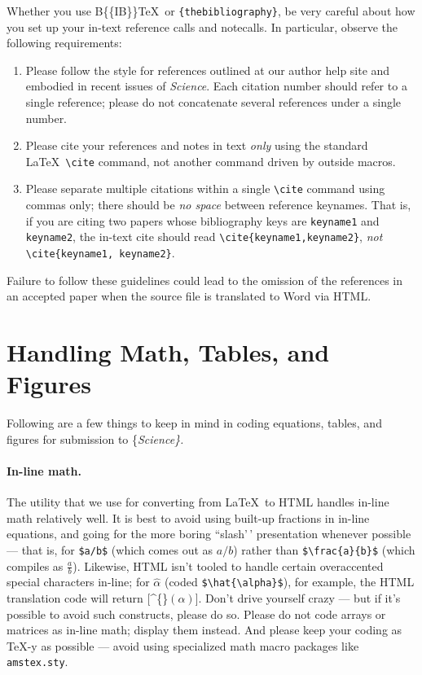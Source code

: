 \documentclass[12pt]{article}
\begin{document}
Whether you use B\{\small\{IB\}\}\TeX~or \texttt{\{thebibliography\}},
be very careful about how you set up your in-text reference calls and
notecalls. In particular, observe the following requirements:

\begin{enumerate}
\item Please follow the style for references outlined at our author
  help site and embodied in recent issues of {\it Science}.  Each
  citation number should refer to a single reference; please do not
  concatenate several references under a single number.
\item Please cite your references and notes in text {\it only\/} using
  the standard \LaTeX\ \verb+\cite+ command, not another command
  driven by outside macros.
\item Please separate multiple citations within a single \verb+\cite+
  command using commas only; there should be {\it no space\/}
  between reference keynames.  That is, if you are citing two
  papers whose bibliography keys are \texttt{keyname1} and
  \texttt{keyname2}, the in-text cite should read
  \verb+\cite{keyname1,keyname2}+, {\it not\/}
  \verb+\cite{keyname1, keyname2}+.
\end{enumerate}

\noindent Failure to follow these guidelines could lead to the omission
of the references in an accepted paper when the source file is
translated to Word via HTML.

\hypertarget{handling-math-tables-and-figures}{%
\section{Handling Math, Tables, and
Figures}\label{handling-math-tables-and-figures}}

Following are a few things to keep in mind in coding equations, tables,
and figures for submission to \{\it Science\}.

\paragraph*{In-line math.}

The utility that we use for converting from \LaTeX~to HTML handles
in-line math relatively well. It is best to avoid using built-up
fractions in in-line equations, and going for the more boring
``slash'\,' presentation whenever possible --- that is, for \verb+$a/b$+
(which comes out as \(a/b\)) rather than \verb+$\frac{a}{b}$+ (which
compiles as \(\frac{a}{b}\)). Likewise, HTML isn't tooled to handle
certain overaccented special characters in-line; for \(\hat{\alpha}\)
(coded \verb+$\hat{\alpha}$+), for example, the HTML translation code
will return {[}\^{}\{\}\((\alpha)\){]}. Don't drive yourself crazy ---
but if it's possible to avoid such constructs, please do so. Please do
not code arrays or matrices as in-line math; display them instead. And
please keep your coding as \TeX-y as possible --- avoid using
specialized math macro packages like \texttt{amstex.sty}.
\end{document}
